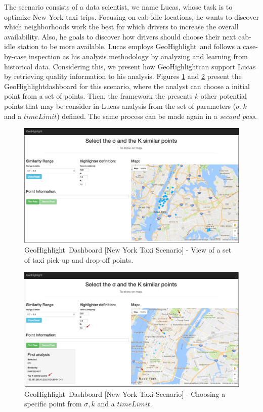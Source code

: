 \documentclass[conference]{IEEEtran}
\newcommand{\sys}{{\sc GeoHighlight}}
\newcommand{\framework}{{\sc GeoHighlight}}
\begin{document}
 The scenario consists of a data scientist, we name Lucas, whose task is to optimize New York taxi trips. Focusing on cab-idle locations, he wants to discover which neighborhoods work the best for which drivers to increase the overall availability. Also, he goals to discover how drivers should choose their next cab-idle station to be more available. Lucas employs \framework\ and follows a case-by-case inspection as his analysis methodology by analyzing and learning from historical data. Considering this,  we present how \sys can support Lucas by retrieving quality information to his analysis. Figures \ref{fig:dashboard} and \ref{fig:dashboard2} present the \sys dashboard for this scenario, where the analyst can choose a initial point from a set of points. Then, the framework the presents $k$ other potential points that may be consider in Lucas analysis from the set of parameters ($\sigma, k$ and a $timeLimit$) defined. The same process can be made again in a \textit{second pass}. 


 \begin{figure}[!ht]
   \centering
   \includegraphics[width=\columnwidth]{figs/dashboard1}
 \caption{\framework\ Dashboard [New York Taxi Scenario] - View of a set of taxi pick-up and drop-off points.}
 \label{fig:dashboard}
 \vspace{-10pt}
 \end{figure}

 \vspace{-5pt}
  \begin{figure}[!ht]
   \centering
   \includegraphics[width=\columnwidth]{figs/dashboard2}
 \caption{\framework\ Dashboard [New York Taxi Scenario] - Choosing a specific point from $\sigma, k$ and a $timeLimit$.}
 \label{fig:dashboard2}
 \vspace{-10pt}
 \end{figure}
 
\end{document}
